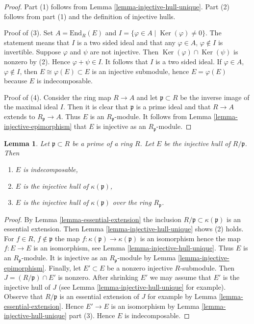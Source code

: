 \documentclass{amsart}
\theoremstyle{plain}
\newtheorem{lemma}[subsection]{Lemma}
\theoremstyle{definition}
\theoremstyle{remark}
\numberwithin{equation}{subsection}
\def\Ker{\mathop{\mathrm{Ker}}}
\begin{document}
\begin{proof}
Part (1) follows from Lemma \ref{lemma-injective-hull-unique}.
Part (2) follows from part (1) and the definition of injective hulls.

\medskip\noindent
Proof of (3). Set $A = \text{End}_R(E)$ and
$I = \{\varphi \in A \mid \Ker(\varphi) \not = 0\}$.
The statement means that $I$ is a two sided ideal and
that any $\varphi \in A$, $\varphi \not \in I$ is invertible.
Suppose $\varphi$ and $\psi$ are not injective.
Then $\Ker(\varphi) \cap \Ker(\psi)$ is nonzero
by (2). Hence $\varphi + \psi \in I$. It follows that $I$
is a two sided ideal. If $\varphi \in A$, $\varphi \not \in I$,
then $E \cong \varphi(E) \subset E$ is an injective submodule,
hence $E = \varphi(E)$ because $E$ is indecomposable.

\medskip\noindent
Proof of (4). Consider the ring map $R \to A$ and let $\mathfrak p \subset R$
be the inverse image of the maximal ideal $I$. Then it is clear
that $\mathfrak p$ is a prime ideal and that $R \to A$ extends to
$R_\mathfrak p \to A$. Thus $E$ is an $R_\mathfrak p$-module.
It follows from Lemma \ref{lemma-injective-epimorphism} that $E$ is injective
as an $R_\mathfrak p$-module.
\end{proof}


\begin{lemma}
\label{lemma-injective-hull-indecomposable}
Let $\mathfrak p \subset R$ be a prime of a ring $R$.
Let $E$ be the injective hull of $R/\mathfrak p$. Then
\begin{enumerate}
\item $E$ is indecomposable,
\item $E$ is the injective hull of $\kappa(\mathfrak p)$,
\item $E$ is the injective hull of $\kappa(\mathfrak p)$
over the ring $R_\mathfrak p$.
\end{enumerate}
\end{lemma}

\begin{proof}
By Lemma \ref{lemma-essential-extension} the inclusion
$R/\mathfrak p \subset \kappa(\mathfrak p)$ is an essential
extension. Then Lemma \ref{lemma-injective-hull-unique}
shows (2) holds. For $f \in R$, $f \not \in \mathfrak p$
the map $f : \kappa(\mathfrak p) \to \kappa(\mathfrak p)$ is an isomorphism
hence the map $f : E \to E$ is an isomorphism,
see Lemma \ref{lemma-injective-hull-unique}.
Thus $E$ is an $R_\mathfrak p$-module. It is injective
as an $R_\mathfrak p$-module by Lemma \ref{lemma-injective-epimorphism}.
Finally, let $E' \subset E$ be a nonzero injective $R$-submodule.
Then $J = (R/\mathfrak p) \cap E'$ is nonzero. After shrinking $E'$
we may assume that $E'$ is the injective hull of $J$ (see
Lemma \ref{lemma-injective-hull-unique} for example).
Observe that $R/\mathfrak p$ is an essential extension of $J$ for example by
Lemma \ref{lemma-essential-extension}. Hence $E' \to E$
is an isomorphism by Lemma \ref{lemma-injective-hull-unique} part (3).
Hence $E$ is indecomposable.
\end{proof}
\end{document}
